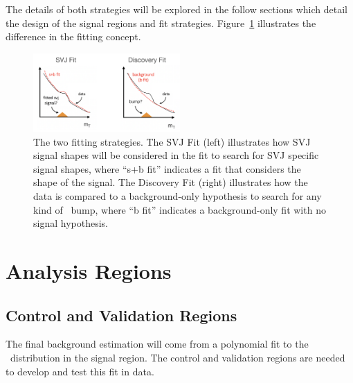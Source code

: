 The details of both strategies will be explored in the follow sections which detail the design of the signal regions and fit strategies.
Figure~\ref{fig:fit_strategy} illustrates the difference in the fitting concept.
\begin{figure}[!htbp]
\centering
    \includegraphics[width=0.5\textwidth]{figures/eventsel/fit_strategy}
    \caption{The two fitting strategies. The SVJ Fit (left) illustrates how SVJ signal shapes will be considered in the fit to search for SVJ specific signal shapes, where ``s+b fit'' indicates a fit that considers the shape of the signal. The Discovery Fit (right) illustrates how the data is compared to a background-only hypothesis to search for any kind of \mt~bump, where ``b fit'' indicates a background-only fit with no signal hypothesis.
    \label{fig:fit_strategy}}
\end{figure}

\section{Analysis Regions}
\subsection{Control and Validation Regions}
\label{subec:sel_crvr}

The final background estimation will come from a polynomial fit to the \mt~distribution in the signal region.
The control and validation regions are needed to develop and test this fit in data.
 
